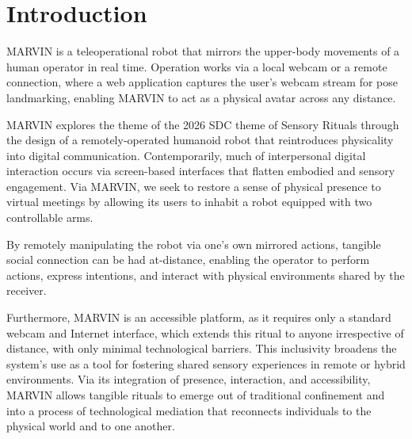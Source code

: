 \documentclass[manuscript,screen]{acmart} %
\begin{document}



\maketitle

\section{Introduction}
MARVIN is a teleoperational robot that mirrors the upper-body movements of a 
human operator in real time. Operation works via a local webcam or a remote 
connection, where a web application captures the user's webcam 
stream for pose landmarking, enabling MARVIN to act as a physical avatar across 
any distance.

MARVIN explores the theme of the 2026 SDC theme of Sensory Rituals through the 
design of a remotely-operated humanoid robot that reintroduces physicality 
into digital communication. 
Contemporarily, much of interpersonal digital interaction occurs via screen-based 
interfaces that flatten embodied and sensory engagement. Via MARVIN, we seek to
restore a sense of physical presence to virtual meetings by allowing its users to
inhabit a robot equipped with two controllable arms.

By remotely manipulating the robot via one's own mirrored actions, tangible social 
connection can be had at-distance, enabling the operator to perform actions, express
intentions, and interact with physical environments shared by the receiver.

Furthermore, MARVIN is an accessible platform, as it requires only a standard 
webcam and Internet interface, which extends this ritual to anyone irrespective
of distance, with only minimal technological barriers. This inclusivity broadens
the system's use as a tool for fostering shared sensory experiences in remote or 
hybrid environments. Via its integration of presence, interaction, and accessibility, 
MARVIN allows tangible rituals to emerge out of traditional confinement and into 
a process of technological mediation that reconnects individuals to the physical world
and to one another.
\end{document}
